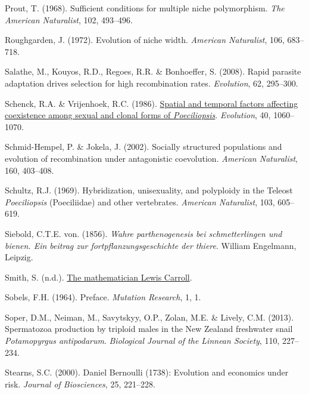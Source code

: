 \documentclass[
  letterpaper,
]{book}
\newlength{\cslhangindent}
\newenvironment{CSLReferences}[2] %
 {\begin{list}{}{%
  \setlength{\itemindent}{0pt}
  \setlength{\leftmargin}{0pt}
  \setlength{\parsep}{0pt}
  \ifodd #1
   \setlength{\leftmargin}{\cslhangindent}
   \setlength{\itemindent}{-1\cslhangindent}
  \fi
  \setlength{\itemsep}{#2\baselineskip}}}
 {\end{list}}
\begin{document}
\begin{CSLReferences}{1}{0}
Prout, T. (1968). Sufficient conditions for multiple niche polymorphism.
\emph{The American Naturalist}, 102, 493--496.

Roughgarden, J. (1972). Evolution of niche width. \emph{American
Naturalist}, 106, 683--718.

Salathe, M., Kouyos, R.D., Regoes, R.R. \& Bonhoeffer, S. (2008). Rapid
parasite adaptation drives selection for high recombination rates.
\emph{Evolution}, 62, 295--300.

Schenck, R.A. \& Vrijenhoek, R.C. (1986).
\href{https://doi.org/10.1111/j.1558-5646.1986.tb00573.x}{Spatial and
temporal factors affecting coexistence among sexual and clonal forms of
\emph{{P}oeciliopsis}}. \emph{Evolution}, 40, 1060--1070.

Schmid-Hempel, P. \& Jokela, J. (2002). Socially structured populations
and evolution of recombination under antagonistic coevolution.
\emph{American Naturalist}, 160, 403--408.

Schultz, R.J. (1969). Hybridization, unisexuality, and polyploidy in the
{Teleost} \emph{{P}oeciliopsis} ({Poeciliidae}) and other vertebrates.
\emph{American Naturalist}, 103, 605--619.

Siebold, C.T.E. von. (1856). \emph{Wahre parthenogenesis bei
schmetterlingen und bienen. Ein beitrag zur fortpflanzungsgeschichte der
thiere}. William Engelmann, Leipzig.

Smith, S. (n.d.).
\href{http://www.herkimershideaway.org/writings/carroll.htm}{The
mathematician {Lewis Carroll}}.

Sobels, F.H. (1964). Preface. \emph{Mutation Research}, 1, 1.

Soper, D.M., Neiman, M., Savytskyy, O.P., Zolan, M.E. \& Lively, C.M.
(2013). Spermatozoa production by triploid males in the {New Zealand}
freshwater snail \emph{{P}otamopyrgus antipodarum}. \emph{Biological
Journal of the Linnean Society}, 110, 227--234.

Stearns, S.C. (2000). {Daniel Bernoulli} (1738): Evolution and economics
under risk. \emph{Journal of Biosciences}, 25, 221--228.


\end{CSLReferences}
\end{document}
